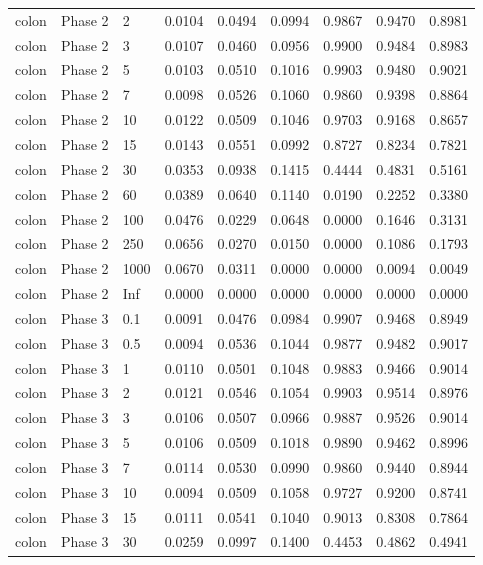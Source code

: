 \begin{tabular}{lllllllll}
  colon & Phase 2 & 2 & 0.0104 & 0.0494 & 0.0994 & 0.9867 & 0.9470 & 0.8981 \\ 
  colon & Phase 2 & 3 & 0.0107 & 0.0460 & 0.0956 & 0.9900 & 0.9484 & 0.8983 \\ 
  colon & Phase 2 & 5 & 0.0103 & 0.0510 & 0.1016 & 0.9903 & 0.9480 & 0.9021 \\ 
  colon & Phase 2 & 7 & 0.0098 & 0.0526 & 0.1060 & 0.9860 & 0.9398 & 0.8864 \\ 
  colon & Phase 2 & 10 & 0.0122 & 0.0509 & 0.1046 & 0.9703 & 0.9168 & 0.8657 \\ 
  colon & Phase 2 & 15 & 0.0143 & 0.0551 & 0.0992 & 0.8727 & 0.8234 & 0.7821 \\ 
  colon & Phase 2 & 30 & 0.0353 & 0.0938 & 0.1415 & 0.4444 & 0.4831 & 0.5161 \\ 
  colon & Phase 2 & 60 & 0.0389 & 0.0640 & 0.1140 & 0.0190 & 0.2252 & 0.3380 \\ 
  colon & Phase 2 & 100 & 0.0476 & 0.0229 & 0.0648 & 0.0000 & 0.1646 & 0.3131 \\ 
  colon & Phase 2 & 250 & 0.0656 & 0.0270 & 0.0150 & 0.0000 & 0.1086 & 0.1793 \\ 
  colon & Phase 2 & 1000 & 0.0670 & 0.0311 & 0.0000 & 0.0000 & 0.0094 & 0.0049 \\ 
  colon & Phase 2 & Inf & 0.0000 & 0.0000 & 0.0000 & 0.0000 & 0.0000 & 0.0000 \\ 
  colon & Phase 3 & 0.1 & 0.0091 & 0.0476 & 0.0984 & 0.9907 & 0.9468 & 0.8949 \\ 
  colon & Phase 3 & 0.5 & 0.0094 & 0.0536 & 0.1044 & 0.9877 & 0.9482 & 0.9017 \\ 
  colon & Phase 3 & 1 & 0.0110 & 0.0501 & 0.1048 & 0.9883 & 0.9466 & 0.9014 \\ 
  colon & Phase 3 & 2 & 0.0121 & 0.0546 & 0.1054 & 0.9903 & 0.9514 & 0.8976 \\ 
  colon & Phase 3 & 3 & 0.0106 & 0.0507 & 0.0966 & 0.9887 & 0.9526 & 0.9014 \\ 
  colon & Phase 3 & 5 & 0.0106 & 0.0509 & 0.1018 & 0.9890 & 0.9462 & 0.8996 \\ 
  colon & Phase 3 & 7 & 0.0114 & 0.0530 & 0.0990 & 0.9860 & 0.9440 & 0.8944 \\ 
  colon & Phase 3 & 10 & 0.0094 & 0.0509 & 0.1058 & 0.9727 & 0.9200 & 0.8741 \\ 
  colon & Phase 3 & 15 & 0.0111 & 0.0541 & 0.1040 & 0.9013 & 0.8308 & 0.7864 \\ 
  colon & Phase 3 & 30 & 0.0259 & 0.0997 & 0.1400 & 0.4453 & 0.4862 & 0.4941 \\ 

\end{tabular}

